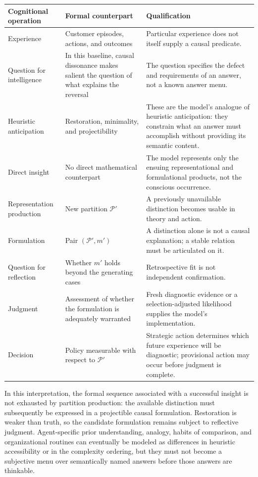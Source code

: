 \documentclass[11pt]{article}
\begin{document}
\begin{center}
\renewcommand{\arraystretch}{1.2}
\begin{tabularx}{\textwidth}{@{}>{\raggedright\arraybackslash}p{}>{\raggedright\arraybackslash}p{}X@{}}
\toprule
\textbf{Cognitional operation} & \textbf{Formal counterpart} &
\textbf{Qualification}\\
\midrule
Experience & Customer episodes, actions, and outcomes & Particular experience
does not itself supply a causal predicate.\\
Question for intelligence & In this baseline, causal dissonance makes salient
the question of what explains the reversal & The question specifies the defect
and requirements of an answer, not a known answer menu.\\
Heuristic anticipation & Restoration, minimality, and projectibility & These
are the model's analogue of heuristic anticipation: they constrain what an
answer must accomplish without providing its semantic content.\\
Direct insight & No direct mathematical counterpart & The model represents
only the ensuing representational and formulational products, not the conscious
occurrence.\\
Representation production & New partition $\mathcal P'$ & A previously
unavailable distinction becomes usable in theory and action.\\
Formulation & Pair $(\mathcal P',m')$ & A distinction alone is not a causal
explanation; a stable relation must be articulated on it.\\
Question for reflection & Whether $m'$ holds beyond the generating cases &
Retrospective fit is not independent confirmation.\\
Judgment & Assessment of whether the formulation is adequately warranted &
Fresh diagnostic evidence or a selection-adjusted likelihood supplies the
model's implementation.\\
Decision & Policy measurable with respect to $\mathcal P'$ & Strategic action
determines which future experience will be diagnostic; provisional action may
occur before judgment is complete.\\
\bottomrule
\end{tabularx}
\end{center}

In this interpretation, the formal sequence associated with a successful
insight is not exhausted by partition production: the available distinction
must subsequently be expressed in a projectible causal formulation.
Restoration is weaker than truth, so the candidate formulation
remains subject to reflective judgment.  Agent-specific prior understanding,
analogy, habits of comparison, and organizational routines can eventually be
modeled as differences in heuristic accessibility or in the complexity
ordering, but they must not become a subjective menu over semantically named
answers before those answers are thinkable.
\end{document}
